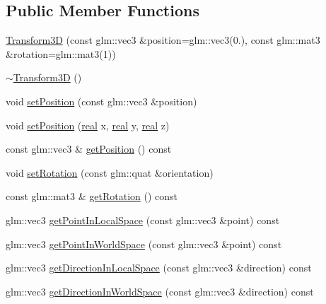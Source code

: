 \subsection*{Public Member Functions}
\begin{DoxyCompactItemize}
\item 
\mbox{\hyperlink{classrum_1_1_transform3_d_a4b44a431541d0dc7231c3558000eab61}{Transform3D}} (const glm\+::vec3 \&position=glm\+::vec3(0.), const glm\+::mat3 \&rotation=glm\+::mat3(1))
\item 
\mbox{\hyperlink{classrum_1_1_transform3_d_a2c17a0b5da412158c1cc2aa1ff633be0}{$\sim$\+Transform3D}} ()
\item 
void \mbox{\hyperlink{classrum_1_1_transform3_d_a1ce0f89805e626b178139c58367b2112}{set\+Position}} (const glm\+::vec3 \&position)
\item 
void \mbox{\hyperlink{classrum_1_1_transform3_d_a03f1b94bd0036915b4062e763850a35f}{set\+Position}} (\mbox{\hyperlink{namespacerum_a7e8cca23573d5eaead0f138cbaa4862c}{real}} x, \mbox{\hyperlink{namespacerum_a7e8cca23573d5eaead0f138cbaa4862c}{real}} y, \mbox{\hyperlink{namespacerum_a7e8cca23573d5eaead0f138cbaa4862c}{real}} z)
\item 
const glm\+::vec3 \& \mbox{\hyperlink{classrum_1_1_transform3_d_ad1f62815d81f803b817b722a13bd6c85}{get\+Position}} () const
\item 
void \mbox{\hyperlink{classrum_1_1_transform3_d_a962ea9ec2f40d9a6928091297f9dea0f}{set\+Rotation}} (const glm\+::quat \&orientation)
\item 
const glm\+::mat3 \& \mbox{\hyperlink{classrum_1_1_transform3_d_a56a0a2d52f2aa82d1fad1eba49455168}{get\+Rotation}} () const
\item 
glm\+::vec3 \mbox{\hyperlink{classrum_1_1_transform3_d_ad3fae07eb90dbebb8b2924f36b4210ea}{get\+Point\+In\+Local\+Space}} (const glm\+::vec3 \&point) const
\item 
glm\+::vec3 \mbox{\hyperlink{classrum_1_1_transform3_d_a7b2ca6927796046b5adb6d0d1ea27de6}{get\+Point\+In\+World\+Space}} (const glm\+::vec3 \&point) const
\item 
glm\+::vec3 \mbox{\hyperlink{classrum_1_1_transform3_d_a53813661be1f72ad440e582769e43c77}{get\+Direction\+In\+Local\+Space}} (const glm\+::vec3 \&direction) const
\item 
glm\+::vec3 \mbox{\hyperlink{classrum_1_1_transform3_d_a7131100d1622a3fb6eff8937154f8291}{get\+Direction\+In\+World\+Space}} (const glm\+::vec3 \&direction) const
\end{DoxyCompactItemize}


